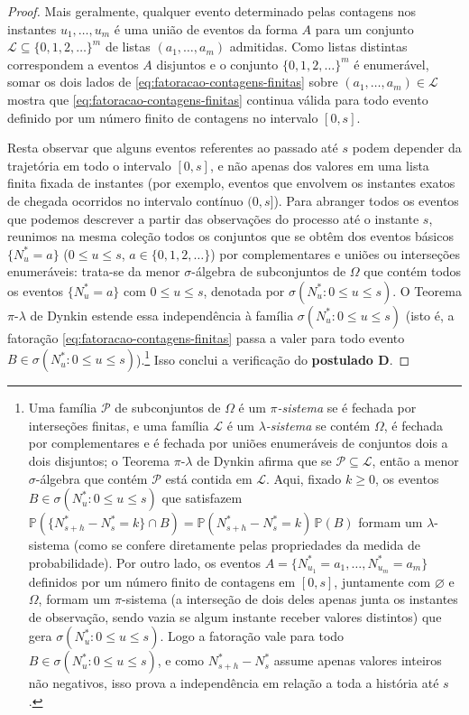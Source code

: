 \documentclass[12pt,portuguese]{article}
\theoremstyle{definition}
\theoremstyle{plainexercise}
\theoremstyle{starredexercise}
\theoremstyle{definition}
\begin{document}
\begin{proof}
Mais geralmente, qualquer evento determinado pelas contagens nos instantes
$u_1,\ldots,u_m$ é uma união de eventos da forma $A$ para um conjunto
$\mathcal{L}\subseteq\{0,1,2,\ldots\}^m$ de listas $(a_1,\ldots,a_m)$ admitidas.
Como listas distintas correspondem a eventos $A$ disjuntos e o conjunto
$\{0,1,2,\ldots\}^m$ é enumerável, somar os dois lados de
\eqref{eq:fatoracao-contagens-finitas} sobre $(a_1,\ldots,a_m)\in\mathcal{L}$
mostra que \eqref{eq:fatoracao-contagens-finitas} continua válida para todo
evento definido por um número finito de contagens no intervalo $[0,s]$.

Resta observar que alguns eventos referentes ao passado até $s$ podem depender da
trajetória em todo o intervalo $[0,s]$, e não apenas dos valores em uma lista
finita fixada de instantes (por exemplo, eventos que envolvem os instantes
exatos de chegada ocorridos no intervalo contínuo $(0,s]$). Para abranger todos os eventos que podemos descrever a
partir das observações do processo até o instante $s$, reunimos na mesma coleção
todos os conjuntos que se obtêm dos eventos básicos $\{N_u^*=a\}$ ($0\leqslant u\leqslant s$,
$a\in\{0,1,2,\ldots\}$) por complementares e uniões ou interseções enumeráveis:
trata-se da menor $\sigma$-álgebra de subconjuntos de $\Omega$ que contém todos
os eventos $\{N_u^*=a\}$ com $0\leqslant u\leqslant s$, denotada por
$\sigma(N_u^*:0\leqslant u\leqslant s)$. O Teorema $\pi$-$\lambda$ de Dynkin estende essa independência à família
$\sigma(N_u^*:0\leqslant u\leqslant s)$ (isto é, a fatoração
\eqref{eq:fatoracao-contagens-finitas} passa a valer para todo evento
$B\in\sigma(N_u^*:0\leqslant u\leqslant s)$).\footnote{Uma família $\mathcal{P}$
de subconjuntos de $\Omega$ é um \emph{$\pi$-sistema} se é fechada por
interseções finitas, e uma família $\mathcal{L}$ é um \emph{$\lambda$-sistema} se
contém $\Omega$, é fechada por complementares e é fechada por uniões enumeráveis
de conjuntos dois a dois disjuntos; o Teorema $\pi$-$\lambda$ de Dynkin afirma que
se $\mathcal{P}\subseteq\mathcal{L}$, então a menor $\sigma$-álgebra que contém
$\mathcal{P}$ está contida em $\mathcal{L}$. Aqui, fixado $k\geqslant0$, os
eventos $B\in\sigma(N_u^*:0\leqslant u\leqslant s)$ que satisfazem
$\mathbb{P}(\{N_{s+h}^*-N_s^*=k\}\cap B)=\mathbb{P}(N_{s+h}^*-N_s^*=k)\,\mathbb{P}(B)$
formam um $\lambda$-sistema (como se confere diretamente pelas propriedades da
medida de probabilidade). Por outro lado, os eventos $A=\{N_{u_1}^*=a_1,\ldots,N_{u_m}^*=a_m\}$
definidos por um número finito de contagens em $[0,s]$, juntamente com $\varnothing$
e $\Omega$, formam um $\pi$-sistema (a interseção de dois deles apenas junta os
instantes de observação, sendo vazia se algum instante receber valores
distintos) que gera $\sigma(N_u^*:0\leqslant u\leqslant s)$. Logo a fatoração
vale para todo $B\in\sigma(N_u^*:0\leqslant u\leqslant s)$, e como
$N_{s+h}^*-N_s^*$ assume apenas valores inteiros não negativos, isso prova a
independência em relação a toda a história até $s$.}
Isso conclui a verificação do \textbf{postulado D}.


\end{proof}
\end{document}
